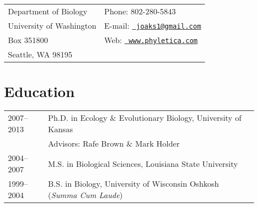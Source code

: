 

\newcommand{\docTitle}{Curriculum Vitae\xspace}

\raggedright
\singlespacing

\noindent\begin{tabular*}{\textwidth}[tb]{ @{}l @{\extracolsep{\fill}} l@{}}
Department of Biology & Phone: 802-280-5843 \\
University of Washington & E-mail: \href{mailto:joaks1@gmail.com}{\tt
                          joaks1@gmail.com} \\
Box 351800 & Web: \href{http://www.phyletica.com}{\tt
                          www.phyletica.com} \\
Seattle, WA 98195  & \\
\end{tabular*}

\section*{Education}
\noindent\begin{tabulary}{\textwidth}{ @{} l L @{} }
2007--2013 & Ph.D. in Ecology \& Evolutionary Biology, University of Kansas \\
              & \addtolength{\leftskip}{5mm}Advisors:  Rafe Brown \& Mark
                Holder \\[0.25em]
2004--2007    & M.S. in Biological Sciences, Louisiana State University
                \\[0.25em]
1999--2004    & B.S. in Biology, University of Wisconsin Oshkosh (\emph{Summa
                Cum Laude}) \\
\end{tabulary}

